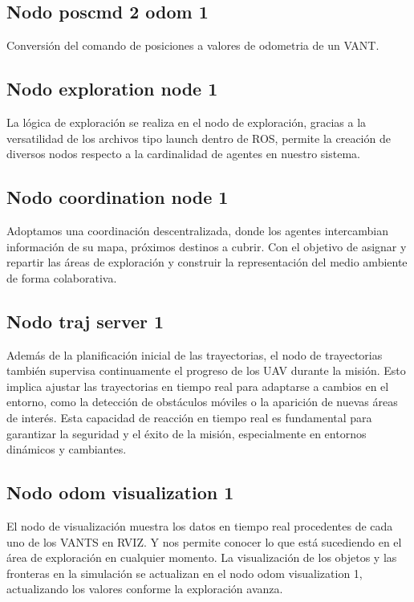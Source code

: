 \subsection*{Nodo poscmd 2 odom 1}
Conversión del comando de posiciones a valores de odometria de un VANT.

\subsection*{Nodo exploration node 1}

La lógica de exploración se realiza en el nodo de exploración, gracias a la versatilidad de los archivos tipo launch dentro de ROS, permite la creación de diversos nodos respecto a la cardinalidad de agentes en nuestro sistema.

\subsection*{Nodo coordination node 1}

Adoptamos una coordinación descentralizada, donde los agentes intercambian información de su mapa, próximos destinos a cubrir.
Con el objetivo de asignar y repartir las áreas de exploración y construir la representación del medio ambiente de forma colaborativa.

\subsection*{Nodo traj server 1}
Además de la planificación inicial de las trayectorias, el nodo de trayectorias también supervisa continuamente el progreso de los UAV durante la misión. Esto implica ajustar las trayectorias en tiempo real para adaptarse a cambios en el entorno, como la detección de obstáculos móviles o la aparición de nuevas áreas de interés. Esta capacidad de reacción en tiempo real es fundamental para garantizar la seguridad y el éxito de la misión, especialmente en entornos dinámicos y cambiantes.

\subsection*{Nodo odom visualization 1}

El nodo de visualización muestra los datos en tiempo real procedentes de cada uno de los VANTS en RVIZ. Y nos permite conocer lo que está sucediendo en el área de exploración en cualquier momento.
La visualización de los objetos y las fronteras en la simulación se actualizan en el nodo odom visualization 1, actualizando los valores conforme la exploración avanza.
